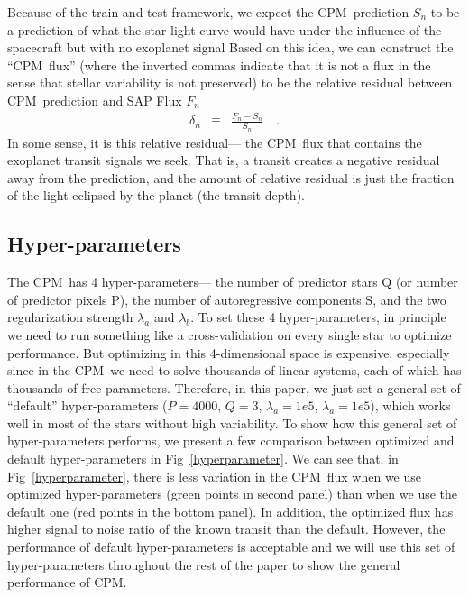 \documentclass[12pt, preprint]{aastex}
\newcommand{\name}{CPM}
\begin{document}
Because of the train-and-test framework,  
  we expect the \name\ prediction $S_{n}$ to be a prediction of
  what the star light-curve would have under the influence of the spacecraft but with no exoplanet signal 
Based on this idea, 
  we can construct the ``\name\ flux'' 
  (where the inverted commas indicate that it is not a flux in the sense that stellar variability is not preserved) 
  to be the relative residual between \name\ prediction and SAP Flux $F_{n}$
\begin{eqnarray}
\delta_{n}&\equiv&\frac{F_{n} - S_{n}}{S_{n}}
\quad .
\end{eqnarray} 
In some sense, it is this relative residual--- the \name\ flux that contains the exoplanet transit signals we seek. 
That is, a transit creates a negative residual away from the prediction, 
  and the amount of relative residual is just the fraction of the light eclipsed by the planet (the transit depth). 

\subsection{Hyper-parameters}
The \name\ has 4 hyper-parameters--- 
  the number of predictor stars Q (or number of predictor pixels P), 
  the number of autoregressive components S, 
  and the two regularization strength $\lambda_{a}$ and $\lambda_{b}$.
To set these 4 hyper-parameters, 
  in principle we need to run something like a cross-validation on every single star to optimize performance.
But optimizing in this 4-dimensional space is expensive, 
  especially since in the \name\ we need to solve thousands of linear systems, 
  each of which has thousands of free parameters. 
Therefore, in this paper, 
  we just set a general set of ``default'' hyper-parameters ($P=4000$, $Q=3$, $\lambda_a=1e5$, $\lambda_a=1e5$), 
  which works well in most of the stars without high variability. 
To show how this general set of hyper-parameters performs, 
  we present a few comparison between optimized and default hyper-parameters 
  in Fig~\ref{hyperparameter}.
We can see that, in Fig~\ref{hyperparameter}, 
  there is less variation in the \name\ flux 
  when we use optimized hyper-parameters (green points in second panel) 
  than when we use the default one (red points in the bottom panel). 
In addition, the optimized flux has higher signal to noise ratio of the known transit than the default. 
However, the performance of default hyper-parameters is acceptable 
  and we will use this set of hyper-parameters throughout the rest of the paper 
  to show the general performance of \name. 
\end{document}
